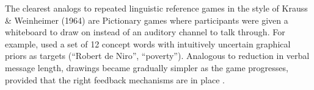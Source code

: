 \documentclass[11pt, floatsintext, jou]{apa6}
\begin{document}
The clearest analogs to repeated linguistic reference games in the style of Krauss \& Weinheimer (1964) are Pictionary games  
where participants were given a whiteboard to draw on instead of an auditory channel to talk through. For example,  used a set of 12 concept words with intuitively uncertain graphical priors as targets (``Robert de Niro'', ``poverty''). %
Analogous to reduction in verbal message length, drawings became gradually simpler as the game progresses, provided that the right feedback mechanisms are in place \cite<see also>{TheisenEtAl10_SystematicityArbitrariness}. 

\end{document}

